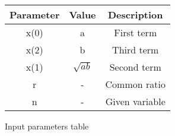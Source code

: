 \centering
\begin{tabular}{|c|c|c|}
        \hline
        \textbf{Parameter} & \textbf{Value} & \textbf{Description} \\
        \hline
	x(0) & a & First term \\
        \hline
	x(2) & b & Third term \\
	\hline
	x(1) & $\sqrt{ab}$ & Second term\\
	\hline
	r & - & Common ratio \\
	\hline
        n & - & Given variable \\
        \hline
\end{tabular}
\caption{Input parameters table}
\label{tab:1}
